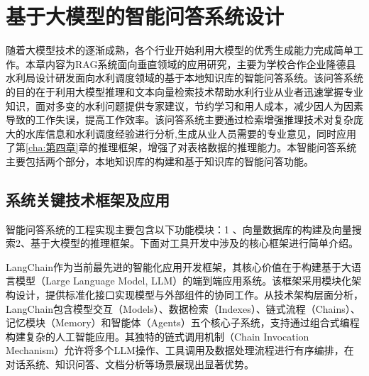 \chapter{基于大模型的智能问答系统设计}
\label{cha:第五章}

随着大模型技术的逐渐成熟，各个行业开始利用大模型的优秀生成能力完成简单工作。本章内容为RAG系统面向垂直领域的应用研究，主要为学校合作企业隆德县水利局设计研发面向水利调度领域的基于本地知识库的智能问答系统。该问答系统的目的在于利用大模型推理和文本向量检索技术帮助水利行业从业者迅速掌握专业知识，面对多变的水利问题提供专家建议，节约学习和用人成本，减少因人为因素导致的工作失误，提高工作效率。该问答系统主要通过检索增强推理技术对复杂庞大的水库信息和水利调度经验进行分析,生成从业人员需要的专业意见，同时应用了第\ref{cha:第四章}章的推理框架，增强了对表格数据的推理能力。本智能问答系统主要包括两个部分，本地知识库的构建和基于知识库的智能问答功能。
\section{系统关键技术框架及应用}

智能问答系统的工程实现主要包含以下功能模块：1 、向量数据库的构建及向量搜索2、基于大模型的推理框架。下面对工具开发中涉及的核心框架进行简单介绍。

LangChain作为当前最先进的智能化应用开发框架，其核心价值在于构建基于大语言模型（Large Language Model, LLM）的端到端应用系统。该框架采用模块化架构设计，提供标准化接口实现模型与外部组件的协同工作。从技术架构层面分析，LangChain包含模型交互（Models）、数据检索（Indexes）、链式流程（Chains）、记忆模块（Memory）和智能体（Agents）五个核心子系统，支持通过组合式编程构建复杂的人工智能应用。其独特的链式调用机制（Chain Invocation Mechanism）允许将多个LLM操作、工具调用及数据处理流程进行有序编排，在对话系统、知识问答、文档分析等场景展现出显著优势。

